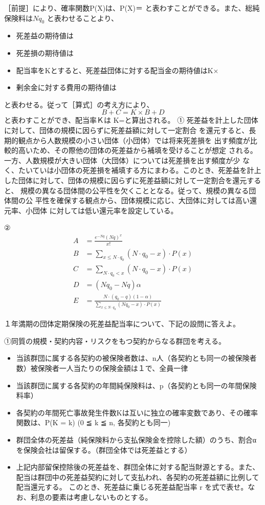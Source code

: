 \documentclass[report,gutter=10mm,fore-edge=10mm,uplatex,dvipdfmx]{jlreq}
\begin{document}
［前提］により、確率関数P(X)は、P(X)＝
と表わすことができる。また、総純保険料は$Nq_0$ と表わせることより、
\begin{itemize}
\item[] 死差益の期待値は
\item[] 死差損の期待値は
\item[] 配当率をKとすると、死差益団体に対する配当金の期待値はK×
\item[] 剰余金に対する費用の期待値は
\end{itemize}
と表わせる。従って［算式］の考え方により、
$$
B + C=K\times B + D
$$
と表わすことができ、配当率Ｋは K=と算出される。
\answer{}
①
死差益を計上した団体に対して、団体の規模に因らずに死差益額に対して一定割合
を還元すると、長期的観点から人数規模の小さい団体（小団体）では将来死差損を
出す頻度が比較的高いため、その際他の団体の死差益から補填を受けることが想定
される。一方、人数規模が大きい団体（大団体）については死差損を出す頻度が少
なく、たいていは小団体の死差損を補填する方にまわる。このとき、死差益を計上
した団体に対して、団体の規模に因らずに死差益額に対して一定割合を還元すると、
規模の異なる団体間の公平性を欠くこととなる。従って、規模の異なる団体間の公
平性を確保する観点から、団体規模に応じ、大団体に対しては高い還元率、小団体
に対しては低い還元率を設定している。

②
\begin{align*}
A&= \frac{e^{-Nq}(Nq)^x}{x!}\\
B&= \sum\limits_{x\leq  N\cdot q_0}  (N\cdot q_0 -x )\cdot P(x)\\
C&= \sum\limits_{N\cdot q_0 < x  }  (N\cdot q_0 -x )\cdot P(x)\\
D&= (Nq_0 - Nq)\alpha\\
 E&=\frac{N\cdot(q_0-q)(1-\alpha)}{\sum\limits_{x\leq N\cdot q_0}(Nq_0-x)\cdot P(x)}
\end{align*}

１年満期の団体定期保険の死差益配当率について、下記の設問に答えよ。

①同質の規模・契約内容・リスクをもつ契約からなる群団を考える。
\begin{itemize}
\item[] 当該群団に属する各契約の被保険者数は、n人（各契約とも同一の被保険者数）被保険者一人当たりの保険金額は１で、全員一律
\item[] 当該群団に属する各契約の年間純保険料は、p（各契約とも同一の年間保険料率）
\item[] 各契約の年間死亡事故発生件数Kは互いに独立の確率変数であり、その確率関数は、P(K = k) (0 ≦ k ≦ n, 各契約とも同一)
\item[] 群団全体の死差益（純保険料から支払保険金を控除した額）のうち、割合αを保険会社は留保する。（群団全体では死差益とする）
\item[] 上記内部留保控除後の死差益を、群団全体に対する配当財源とする。また、配当は群団中の死差益契約に対して支払われ、各契約の死差益額に比例して配当還元する。
 このとき、死差益に乗じる死差益配当率 r を式で表せ。なお、利息の要素は考慮しないものとする。
\end{itemize}
\end{document}
